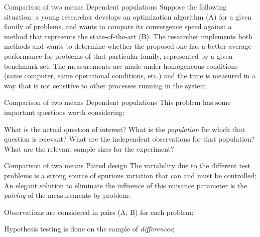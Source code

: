 \documentclass[t]{beamer}
\begin{document}

\begin{ftst}
{Comparison of two means}
{Dependent populations}
Suppose the following situation: a young researcher develops an optimization algorithm (A) for a given family of problems, and wants to compare its convergence speed against a method that represents the state-of-the-art (B).
\vone
The researcher implements both methods and wants to determine whether the proposed one has a better average performance for problems of that particular family, represented by a given benchmark set.
\vone
The measurements are made under homogeneous conditions (same computer, same operational conditions, etc.) and the time is measured in a way that is not sensitive to other processes running in the system.
\vone
\end{ftst}


\begin{ftst}
{Comparison of two means}
{Dependent populations}
This problem has some important questions worth considering:

\bitems What is the actual question of interest?
\spitem What is the \textit{population} for which that question is relevant?
\spitem What are the independent observations for that population?
\spitem What are the relevant sample sizes for the experiment?
\eitem
\end{ftst}


\begin{ftst}
{Comparison of two means}
{Paired design}
The variability due to the different test problems is a strong source of spurious variation that can and must be controlled;
\vone
An elegant solution to eliminate the influence of this nuisance parameter is the \textit{pairing} of the measurements by problem:

\bitems Observations are considered in pairs (A, B) for each problem; 
\item Hypothesis testing is done on the sample of \textit{differences};
\eitem
\end{ftst}

\end{document}
